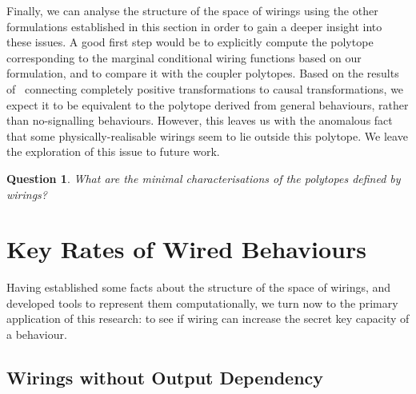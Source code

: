 \documentclass[10pt, a4paper]{article}
\numberwithin{equation}{section} %
\theoremstyle{definition}
\theoremstyle{plain}
\newtheorem{question}{Question}
\newcommand{\?}{\mathrel{?}} %
\begin{document}
                  Finally, we can analyse the structure of the space of wirings using the other formulations established in this section in order to gain a deeper insight into these issues. A good first step would be to explicitly compute the polytope corresponding to the marginal conditional wiring functions based on our formulation, and to compare it with the coupler polytopes. Based on the results of~\cite{LocalTransformations} connecting completely positive transformations to causal transformations, we expect it to be equivalent to the polytope derived from general behaviours, rather than no-signalling behaviours. However, this leaves us with the anomalous fact that some physically-realisable wirings seem to lie outside this polytope. We leave the exploration of this issue to future work.
                  \begin{question}
                    What are the minimal characterisations of the polytopes defined by wirings?
                  \end{question}

                  \section{Key Rates of Wired Behaviours}\label{sec:krwir}

                  Having established some facts about the structure of the space of wirings, and developed tools to represent them computationally, we turn now to the primary application of this research: to see if wiring can increase the secret key capacity of a behaviour.

                  \subsection{Wirings without Output Dependency}\label{sec:krwir_outdep}

\end{document}
